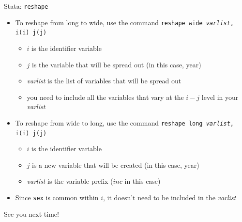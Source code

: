 \documentclass[11pt,notes=hide,aspectratio=169,mathserif]{beamer}
\begin{document}
\begin{frame}{Stata: \texttt{reshape}}
\begin{itemize}
\item To reshape from long to wide, use the command \texttt{reshape wide \textit{varlist}, i(i) j(j) }
\begin{itemize}
    \item $i$ is the identifier variable
    \item $j$ is the variable that will be spread out (in this case, year)
    \item \textit{varlist} is the list of variables that will be spread out
    \item you need to include all the variables that vary at the $i-j$ level in your  \textit{varlist}
\end{itemize}
\pause
\item To reshape from wide to long, use the command \texttt{reshape long \textit{varlist}, i(i) j(j) }
\begin{itemize}
    \item $i$ is the identifier variable
    \item $j$ is a new variable that will be created (in this case, year) 
    \item \textit{varlist} is the variable prefix ($inc$ in this case)
\end{itemize}
\item Since \texttt{sex} is common within $i$, it doesn't need to be included in the \textit{varlist}
\end{itemize}
\end{frame}


\begin{frame}
\begin{center}{\LARGE See you next time!}\end{center}
\end{frame}
\end{document}
